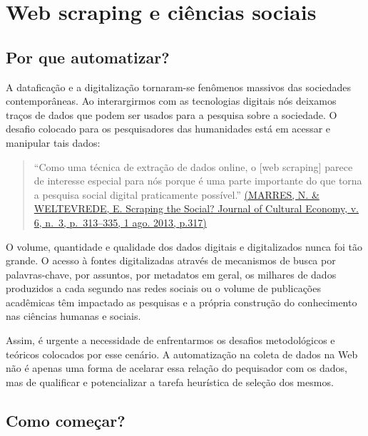 \documentclass[
]{book}
\begin{document}
\hypertarget{web-scraping-e-ciuxeancias-sociais}{%
\chapter{Web scraping e ciências sociais}\label{web-scraping-e-ciuxeancias-sociais}}

\hypertarget{por-que-automatizar}{%
\section{Por que automatizar?}\label{por-que-automatizar}}

A dataficação e a digitalização tornaram-se fenômenos massivos das sociedades contemporâneas. Ao interargirmos com as tecnologias digitais nós deixamos traços de dados que podem ser usados para a pesquisa sobre a sociedade. O desafio colocado para os pesquisadores das humanidades está em acessar e manipular tais dados:

\begin{quote}
``Como uma técnica de extração de dados online, o {[}web scraping{]} parece de interesse especial para nós porque é uma parte importante do que torna a pesquisa social digital praticamente possível.'' \href{https://www.tandfonline.com/doi/abs/10.1080/17530350.2013.772070}{(MARRES, N. \& WELTEVREDE, E. Scraping the Social? Journal of Cultural Economy, v. 6, n.~3, p.~313--335, 1 ago. 2013, p.317)}
\end{quote}

O volume, quantidade e qualidade dos dados digitais e digitalizados nunca foi tão grande. O acesso à fontes digitalizadas através de mecanismos de busca por palavras-chave, por assuntos, por metadatos em geral, os milhares de dados produzidos a cada segundo nas redes sociais ou o volume de publicações acadêmicas têm impactado as pesquisas e a própria construção do conhecimento nas ciências humanas e sociais.

Assim, é urgente a necessidade de enfrentarmos os desafios metodológicos e teóricos colocados por esse cenário. A automatização na coleta de dados na Web não é apenas uma forma de acelarar essa relação do pequisador com os dados, mas de qualificar e potencializar a tarefa heurística de seleção dos mesmos.

\hypertarget{como-comeuxe7ar}{%
\section{Como começar?}\label{como-comeuxe7ar}}
\end{document}
